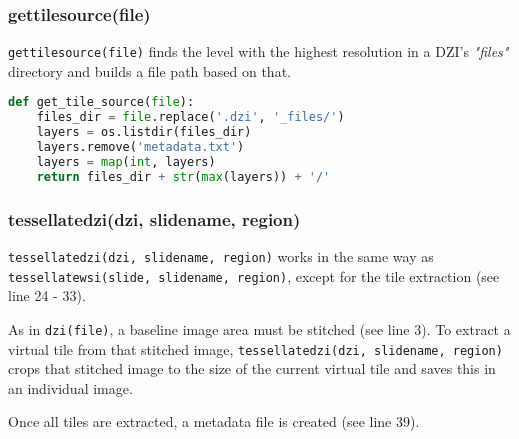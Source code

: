 \subsubsection{get{\textunderscore}tile{\textunderscore}source(file)}
\texttt{get{\textunderscore}tile{\textunderscore}source(file)} finds the level with the highest resolution in a DZI's \emph{"{\textunderscore}files"} directory and builds a file path based on that.

\begin{lstlisting}[frame=single,language=python]
def get_tile_source(file):
	files_dir = file.replace('.dzi', '_files/')
	layers = os.listdir(files_dir)
	layers.remove('metadata.txt')
	layers = map(int, layers)
	return files_dir + str(max(layers)) + '/'
\end{lstlisting}


\subsubsection{tessellate{\textunderscore}dzi(dzi, slide{\textunderscore}name, region)}
\texttt{tessellate{\textunderscore}dzi(dzi, slide{\textunderscore}name, region)} works in the same way as \texttt{tessellate{\textunderscore}wsi(slide, slide{\textunderscore}name, region)}, except for the tile extraction (see line 24 - 33).

As in \texttt{dzi(file)}, a baseline image area must be stitched (see line 3). To extract a virtual tile from that stitched image, \texttt{tessellate{\textunderscore}dzi(dzi, slide{\textunderscore}name, region)} crops that stitched image to the size of the current virtual tile and saves this in an individual image.

Once all tiles are extracted, a metadata file is created (see line 39).

